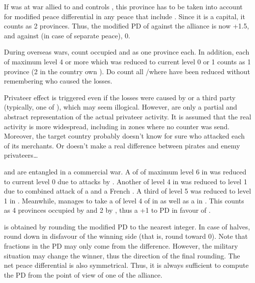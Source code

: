 \begin{exemple}
  If \paysCrimee was at war allied to \TUR and \RUS controls \provinceCrimee,
  this province has to be taken into account for modified peace differential
  in any peace that include \TUR. Since it is a capital, it counts as 2
  provinces. Thus, the modified PD of \RUS against the alliance is now +1.5,
  and against \TUR (in case of separate peace), 0.
\end{exemple}

\bparag During overseas wars, count occupied \COL and \TP as one province
each.
 In addition, each \TradeFLEET of maximum level 4 or
more which was reduced to current level 0 or 1 counts as 1 province (2 in the
country own \CTZ).
\bparag Do count all \CTZ/\STZ where \TradeFLEET have been reduced without
remembering who caused the losses.

\begin{designnote}
  Privateer effect is triggered even if the losses were caused by
   or a third party \corsaire (typically, one of
  \Barbaresques), which may seem illogical. However, \corsaire are only a
  partial and abstract representation of the actual privateer activity. It is
  assumed that the real activity is more widespread, including in zones where
  no counter was send. Moreover, the target country probably doesn't know for
  sure who attacked each of its merchants. Or doesn't make a real difference
  between pirates and enemy privateers\ldots
\end{designnote}

\begin{exemple}
  \FRA and \ANG are entangled in a commercial war. A \TradeFLEET of \ANG of
  maximum level 6 in  was reduced to current level 0 due to
  attacks by \leaderBart. Another \TradeFLEET of level 4 in 
  was reduced to level 1 due to combined attack of a  \corsaire
  and a French \corsaire. A third \TradeFLEET of level 5 was reduced to level
  1 in . Meanwhile, \ANG manages to take a \COL of level 4 of \FRA
  in \granderegionQuebec as well as a \TP in \continentIndia. This counts as 4
  provinces occupied by \FRA and 2 by \ANG, thus a +1 to PD in favour of \FRA.
\end{exemple}

 is obtained by rounding the modified PD to
the nearest integer. In case of halves, round down in disfavour of the winning
side (that is, round toward 0).
\bparag Note that fractions in the PD may only come from the \STAB
difference. However, the military situation may change the winner, thus the
direction of the final rounding.
\bparag The net peace differential is also symmetrical. Thus, it is always
sufficient to compute the PD from the point of view of one of the alliance.

